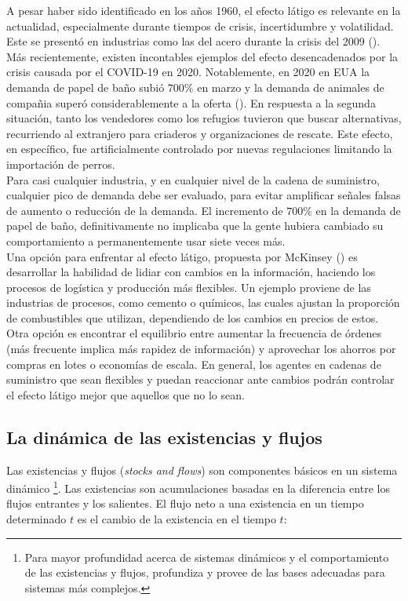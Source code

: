 A pesar haber sido identificado en los a\~nos 1960, el efecto l\'atigo es relevante en la actualidad, especialmente durante tiempos de crisis, incertidumbre y volatilidad. Este se present\'o en industrias como las del acero durante la crisis del 2009 (\citet{mckbullwhip}). M\'as recientemente, existen incontables ejemplos del efecto desencadenados por la crisis causada por el COVID-19 en 2020. Notablemente, en 2020 en EUA la demanda de papel de ba\~no subi\'o $700\%$ en marzo y la demanda de animales de compa\~nia super\'o considerablemente a la oferta (\citet{bloombullwhip}). En respuesta a la segunda situaci\'on, tanto los vendedores como los refugios tuvieron que buscar alternativas, recurriendo al extranjero para criaderos y organizaciones de rescate. Este efecto, en espec\'ifico, fue artificialmente controlado por nuevas regulaciones limitando la importaci\'on de perros.\\

Para casi cualquier industria, y en cualquier nivel de la cadena de suministro, cualquier pico de demanda debe ser evaluado, para evitar amplificar se\~nales falsas de aumento o reducci\'on de la demanda. El incremento de $700\%$ en la demanda de papel de ba\~no, definitivamente no implicaba que la gente hubiera cambiado su comportamiento a permanentemente usar siete veces m\'as. \\

Una opci\'on para enfrentar al efecto l\'atigo, propuesta por McKinsey (\cite{mckbullwhip}) es desarrollar la habilidad de lidiar con cambios en la informaci\'on, haciendo los procesos de log\'istica y producci\'on m\'as flexibles. Un ejemplo proviene de las industrias de procesos, como cemento o qu\'imicos, las cuales ajustan la proporci\'on de combustibles que utilizan, dependiendo de los cambios en precios de estos. Otra opci\'on es encontrar el equilibrio entre aumentar la frecuencia de \'ordenes (m\'as frecuente implica m\'as rapidez de informaci\'on) y aprovechar los ahorros por compras en lotes o econom\'ias de escala. En general, los agentes en cadenas de suministro que sean flexibles y puedan reaccionar ante cambios podr\'an controlar el efecto l\'atigo mejor que aquellos que no lo sean.

\subsection{La din\'amica de las existencias y flujos}

Las existencias y flujos (\textit{stocks and flows}) son componentes b\'asicos en un sistema din\'amico \footnote{Para mayor profundidad acerca de sistemas din\'amicos y el comportamiento de las existencias y flujos, \citet{Sterman} profundiza y provee de las bases adecuadas para sistemas m\'as complejos.}. Las existencias son acumulaciones basadas en la diferencia entre los flujos entrantes y los salientes. El flujo neto a una existencia en un tiempo determinado $t$ es el cambio de la existencia en el tiempo $t$:

